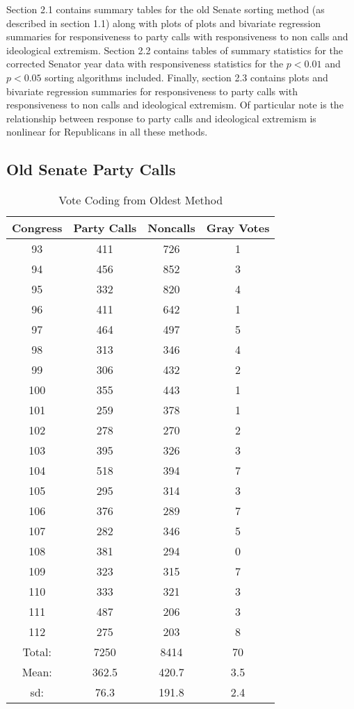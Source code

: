 \documentclass[12pt]{article}
\begin{document}
Section 2.1 contains summary tables for the old Senate sorting method (as described in section 1.1) along with plots of plots and bivariate regression summaries for responsiveness to party calls with responsiveness to non calls and ideological extremism. Section 2.2 contains tables of summary statistics for the corrected Senator year data with responsiveness statistics for the $ p < 0.01 $ and $ p < 0.05 $ sorting algorithms included. Finally, section 2.3 contains plots and bivariate regression summaries for responsiveness to party calls with responsiveness to non calls and ideological extremism. Of particular note is the relationship between response to party calls and ideological extremism is nonlinear for Republicans in all these methods.

\pagebreak

\subsection{Old Senate Party Calls}

\begin{table}[ht]
	\caption{Vote Coding from Oldest Method}
	\centering
	\begin{tabular}{cccc}
		\hline
		Congress & Party Calls & Noncalls & Gray Votes \\ 
		\hline
		93 & 411 & 726 &   1 \\ 
		94 & 456 & 852 &   3 \\ 
		95 & 332 & 820 &   4 \\ 
		96 & 411 & 642 &   1 \\ 
		97 & 464 & 497 &   5 \\ 
		98 & 313 & 346 &   4 \\ 
		99 & 306 & 432 &   2 \\ 
		100 & 355 & 443 &   1 \\ 
		101 & 259 & 378 &   1 \\ 
		102 & 278 & 270 &   2 \\ 
		103 & 395 & 326 &   3 \\ 
		104 & 518 & 394 &   7 \\ 
		105 & 295 & 314 &   3 \\ 
		106 & 376 & 289 &   7 \\ 
		107 & 282 & 346 &   5 \\ 
		108 & 381 & 294 &   0 \\ 
		109 & 323 & 315 &   7 \\ 
		110 & 333 & 321 &   3 \\ 
		111 & 487 & 206 &   3 \\ 
		112 & 275 & 203 &   8 \\ 
		\hline
		Total: & 7250 & 8414 & 70 \\
		Mean: & 362.5 & 420.7 & 3.5 \\
		sd: & 76.3 & 191.8 & 2.4 \\
		\hline
	\end{tabular}
\end{table}
\end{document}
